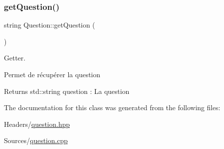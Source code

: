 \subsubsection{\texorpdfstring{get\+Question()}{getQuestion()}}
{\footnotesize\ttfamily string Question\+::get\+Question (\begin{DoxyParamCaption}{ }\end{DoxyParamCaption})}



Getter. 

Permet de récupérer la question \begin{DoxyReturn}{Returns}
std\+::string question \+: La question 
\end{DoxyReturn}


The documentation for this class was generated from the following files\+:\begin{DoxyCompactItemize}
\item 
Headers/\mbox{\hyperlink{question_8hpp}{question.\+hpp}}\item 
Sources/\mbox{\hyperlink{question_8cpp}{question.\+cpp}}\end{DoxyCompactItemize}
